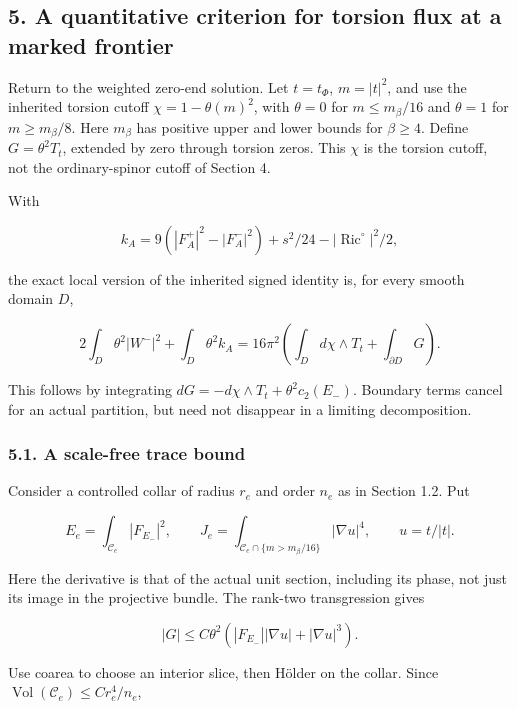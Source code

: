 \documentclass[
  11pt,
]{article}
\begin{document}
\hypertarget{a-quantitative-criterion-for-torsion-flux-at-a-marked-frontier}{%
\subsection{5. A quantitative criterion for torsion flux at a marked
frontier}\label{a-quantitative-criterion-for-torsion-flux-at-a-marked-frontier}}

Return to the weighted zero-end solution. Let \(t=t_\Phi\), \(m=|t|^2\),
and use the inherited torsion cutoff \(\chi=1-\theta(m)^2\), with
\(\theta=0\) for \(m\le m_\beta/16\) and \(\theta=1\) for
\(m\ge m_\beta/8\). Here \(m_\beta\) has positive upper and lower bounds
for \(\beta\ge4\). Define \(G=\theta^2T_t\), extended by zero through
torsion zeros. This \(\chi\) is the torsion cutoff, not the
ordinary-spinor cutoff of Section 4.

With

\[
 k_A=9(|F_A^+|^2-|F_A^-|^2)+s^2/24-|\operatorname{Ric}^{\circ}|^2/2,
\]

the exact local version of the inherited signed identity is, for every
smooth domain \(D\),

\[
 2\int_D\theta^2|W^-|^2+\int_D\theta^2 k_A
   =16\pi^2\left(\int_Dd\chi\wedge T_t+
                                      \int_{\partial D}G\right).
 \tag{5.1}
\]

This follows by integrating \(dG=-d\chi\wedge T_t+\theta^2c_2(E_-)\).
Boundary terms cancel for an actual partition, but need not disappear in
a limiting decomposition.

\hypertarget{a-scale-free-trace-bound}{%
\subsubsection{5.1. A scale-free trace
bound}\label{a-scale-free-trace-bound}}

Consider a controlled collar of radius \(r_e\) and order \(n_e\) as in
Section 1.2. Put

\[
 E_e=\int_{\mathcal C_e}|F_{E_-}|^2,\qquad
 J_e=\int_{\mathcal C_e\cap\{m>m_\beta/16\}}|\nabla u|^4,
 \qquad u=t/|t|.
\]

Here the derivative is that of the actual unit section, including its
phase, not just its image in the projective bundle. The rank-two
transgression gives

\[
 |G|\le C\theta^2(|F_{E_-}||\nabla u|+|\nabla u|^3).
\]

Use coarea to choose an interior slice, then Hölder on the collar. Since
\(\operatorname{Vol}(\mathcal C_e)\le Cr_e^4/n_e\),
\end{document}
